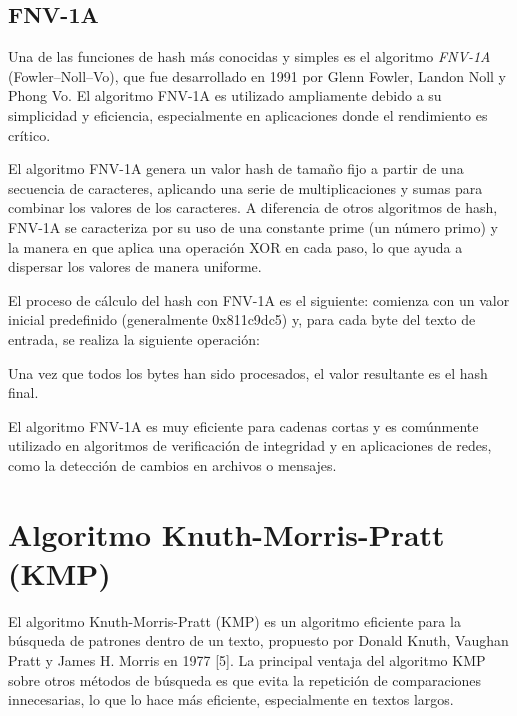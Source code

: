 \documentclass{article}
\begin{document}
\subsection{FNV-1A}
Una de las funciones de hash más conocidas y simples es el algoritmo \textit{FNV-1A} (Fowler–Noll–Vo), que fue desarrollado en 1991 por Glenn Fowler, Landon Noll y Phong Vo. El algoritmo FNV-1A es utilizado ampliamente debido a su simplicidad y eficiencia, especialmente en aplicaciones donde el rendimiento es crítico.

El algoritmo FNV-1A genera un valor hash de tamaño fijo a partir de una secuencia de caracteres, aplicando una serie de multiplicaciones y sumas para combinar los valores de los caracteres. A diferencia de otros algoritmos de hash, FNV-1A se caracteriza por su uso de una constante prime (un número primo) y la manera en que aplica una operación XOR en cada paso, lo que ayuda a dispersar los valores de manera uniforme.

El proceso de cálculo del hash con FNV-1A es el siguiente: comienza con un valor inicial predefinido (generalmente 0x811c9dc5) y, para cada byte del texto de entrada, se realiza la siguiente operación:



Una vez que todos los bytes han sido procesados, el valor resultante es el hash final.

El algoritmo FNV-1A es muy eficiente para cadenas cortas y es comúnmente utilizado en algoritmos de verificación de integridad y en aplicaciones de redes, como la detección de cambios en archivos o mensajes.

\section{Algoritmo Knuth-Morris-Pratt (KMP)}
El algoritmo Knuth-Morris-Pratt (KMP) es un algoritmo eficiente para la búsqueda de patrones dentro de un texto, propuesto por Donald Knuth, Vaughan Pratt y James H. Morris en 1977 [5]. La principal ventaja del algoritmo KMP sobre otros métodos de búsqueda es que evita la repetición de comparaciones innecesarias, lo que lo hace más eficiente, especialmente en textos largos.
\end{document}

